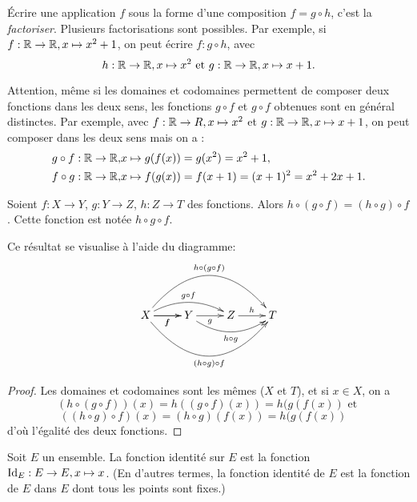 \begin{definition}
\'Ecrire une application $f$ sous la forme d'une composition $f = g\circ h$, c'est la \emph{factoriser}. Plusieurs factorisations sont possibles. Par exemple, si $f : \mathbb{R}\to \mathbb{R}, x\mapsto x^2+1$, on peut écrire $f : g\circ h$, avec
\[
h : \mathbb{R}\to \mathbb{R}, x\mapsto x^2 
\text{ et }
g : \mathbb{R}\to \mathbb{R}, x\mapsto x+1.
\]
\end{definition}

\begin{remarque} Attention, même si les domaines et codomaines permettent de composer deux fonctions dans les deux sens, les fonctions $g\circ f$ et $g\circ f$ obtenues sont en général distinctes. Par exemple, avec $f : \mathbb{R}\to R, x\mapsto x^2
$ et $g : \mathbb{R}\to \mathbb{R}, x\mapsto x+1$,  on peut composer dans les deux sens mais on a :
\begin{align*}
g\circ f : \mathbb{R}\to \mathbb{R}, & x\mapsto g(f(x)) = g(x^2) = x^2+1,\\
f\circ g : \mathbb{R}\to \mathbb{R}, & x\mapsto f(g(x)) = f(x+1) = (x+1)^2 = x^2+2x+1.
\end{align*}
\end{remarque}


\begin{proposition}
Soient $f : X\to Y$, $g : Y\to Z$, $h  : Z\to T$ des fonctions. Alors $h\circ (g\circ f) = (h\circ g)\circ f$. Cette fonction est notée $h\circ g\circ f$.

Ce résultat se visualise à l'aide du diagramme:
\[
\xymatrix{
X \ar[r]_{f} \ar@/^1pc/[rr]^{g\circ f} \ar[r]_{f} \ar@/^3pc/[rrr]^{h\circ (g\circ f)} \ar@/_3pc/[rrr]_{(h\circ g) \circ f}& Y \ar[r]_{g} \ar@/_1.2pc/[rr]_{h\circ g} & Z \ar[r]^{h} & T
}
\]

\end{proposition}
\begin{proof}
Les domaines et codomaines sont les mêmes ($X$ et $T$), et si $x\in X$, on a 
\[ \left(h\circ (g\circ f)\right) (x) = h((g\circ f)(x)) = h(g(f(x)) \text{ et } \]
\[ \left( (h\circ g)\circ f \right) (x) = (h \circ g)(f(x)) = h(g(f(x))\quad \]
d'où l'égalité des deux fonctions.
\end{proof}

\begin{definition}
Soit $E$ un ensemble. La fonction identité sur $E$ est la fonction $\operatorname{Id}_E : E\to E, x\mapsto x$. (En d'autres termes, la fonction identité de $E$ est la fonction de $E$ dans $E$ dont tous les points sont fixes.)
\end{definition}

